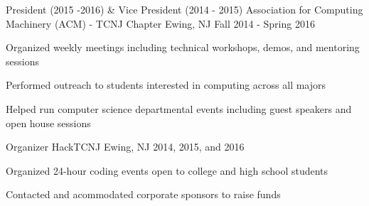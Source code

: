 
\begin{cventries}

  \cventry
  {President (2015 -2016) \& Vice President (2014 - 2015)} %
  {Association for Computing Machinery (ACM) - TCNJ Chapter} %
  {Ewing, NJ} %
  {Fall 2014 - Spring 2016} %
  {
    \begin{cvitems} %
    \item {Organized weekly meetings including technical workshops, demos, and mentoring sessions}
    \item {Performed outreach to students interested in computing across all majors}
    \item {Helped run computer science departmental events including guest speakers and open house sessions}
    \end{cvitems}
  }

  \cventry
  {Organizer} %
  {HackTCNJ} %
  {Ewing, NJ} %
  {2014, 2015, and 2016} %
  {
    \begin{cvitems} %
    \item {Organized 24-hour coding events open to college and high school students}
    \item {Contacted and acommodated corporate sponsors to raise funds}
    \end{cvitems}
  }
\end{cventries}
